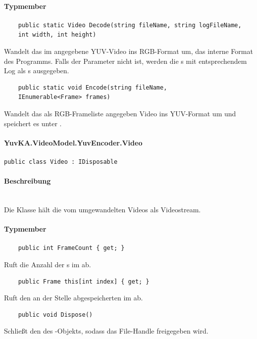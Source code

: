 \paragraph{Typmember}
\begin{itemize}

	\begin{verbatim}
	public static Video Decode(string fileName, string logFileName,
    int width, int height)
	\end{verbatim}
	Wandelt das im  angegebene YUV-Video ins RGB-Format um, das interne Format des Programms. Falls der Parameter  nicht  ist, werden die s mit entsprechendem Log als s ausgegeben.

	\begin{verbatim}
	public static void Encode(string fileName,
    IEnumerable<Frame> frames)
	\end{verbatim}
	Wandelt das als RGB-Frameliste angegeben Video ins YUV-Format um und speichert es unter . 

\end{itemize}

\setcounter{secnumdepth}{4}
\paragraph{YuvKA.VideoModel.YuvEncoder.Video}
\setcounter{secnumdepth}{3}

\begin{verbatim}
public class Video : IDisposable
\end{verbatim}

\paragraph{Beschreibung}~\\
Die Klasse  hält die vom  umgewandelten Videos als Videostream.

\paragraph{Typmember}
\begin{itemize}

	\begin{verbatim}
	public int FrameCount { get; }
	\end{verbatim}
	Ruft die Anzahl der s im  ab.

	\begin{verbatim}
	public Frame this[int index] { get; }
	\end{verbatim}
	Ruft den an der Stelle  abgespeicherten  im  ab.

	\begin{verbatim}
	public void Dispose()
	\end{verbatim}
	Schließt den  des -Objekts, sodass das File-Handle freigegeben wird.

\end{itemize}

